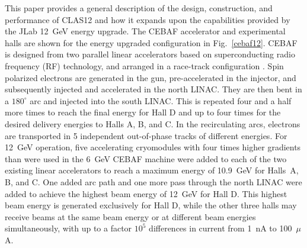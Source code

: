 \documentclass[final,3p,twocolumn]{elsarticle}
\begin{document}
This paper provides a general description of the design, construction, and performance of CLAS12 and how it expands
upon the capabilities provided by the JLab 12~GeV energy upgrade. The CEBAF accelerator and experimental halls are
shown for the energy upgraded configuration in Fig.~\ref{cebaf12}. CEBAF is designed from two parallel linear
accelerators based on superconducting radio frequency (RF) technology, and arranged in a race-track configuration
\cite{Leemann:2001dg}. Spin polarized electrons are generated in the gun, pre-accelerated in the injector, and
subsequently injected and accelerated in the north LINAC. They are then bent in a $180^\circ$ arc and injected into the
south LINAC. This is repeated four and a half more times to reach the final energy for Hall D and up to four times  for the
desired delivery energies to Halls A, B, and C. In the recirculating arcs, electrons are transported in 5 independent
out-of-phase tracks of different energies. For 12~GeV operation, five accelerating cryomodules with four times higher
gradients than were used in the 6~GeV CEBAF machine were added to each of the two existing linear accelerators to reach
a maximum energy of 10.9~GeV for Halls~A, B, and C. One added arc path and one more pass through the north LINAC were
added to achieve the highest beam energy of 12~GeV for Hall D. This highest beam energy is generated exclusively for
Hall D, while the other three halls may receive beams at the same beam energy or at different beam energies simultaneously,
with up to a factor $10^5$ differences in current from 1~nA to 100~$\mu$A.
\end{document}
